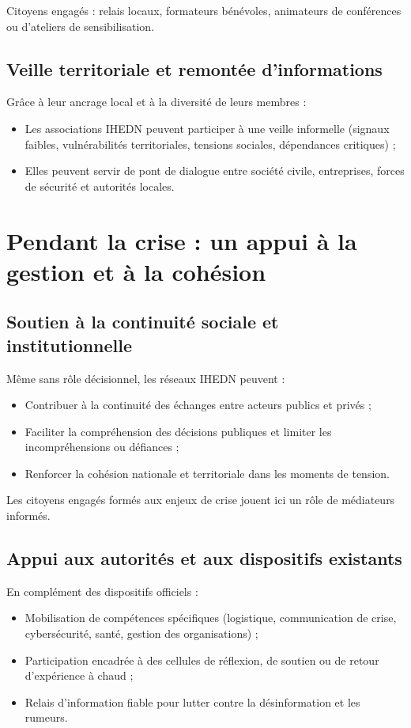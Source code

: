 \documentclass[12pt,a4paper]{article}
\begin{document}
Citoyens engagés : relais locaux, formateurs bénévoles, animateurs de conférences ou d'ateliers de sensibilisation.

\subsection{Veille territoriale et remontée d'informations}

Grâce à leur ancrage local et à la diversité de leurs membres :
\begin{itemize}
    \item Les associations IHEDN peuvent participer à une veille informelle (signaux faibles, vulnérabilités territoriales, tensions sociales, dépendances critiques) ;
    \item Elles peuvent servir de pont de dialogue entre société civile, entreprises, forces de sécurité et autorités locales.
\end{itemize}

\section{Pendant la crise : un appui à la gestion et à la cohésion}

\subsection{Soutien à la continuité sociale et institutionnelle}

Même sans rôle décisionnel, les réseaux IHEDN peuvent :
\begin{itemize}
    \item Contribuer à la continuité des échanges entre acteurs publics et privés ;
    \item Faciliter la compréhension des décisions publiques et limiter les incompréhensions ou défiances ;
    \item Renforcer la cohésion nationale et territoriale dans les moments de tension.
\end{itemize}

Les citoyens engagés formés aux enjeux de crise jouent ici un rôle de médiateurs informés.

\subsection{Appui aux autorités et aux dispositifs existants}

En complément des dispositifs officiels :
\begin{itemize}
    \item Mobilisation de compétences spécifiques (logistique, communication de crise, cybersécurité, santé, gestion des organisations) ;
    \item Participation encadrée à des cellules de réflexion, de soutien ou de retour d'expérience à chaud ;
    \item Relais d'information fiable pour lutter contre la désinformation et les rumeurs.
\end{itemize}
\end{document}
